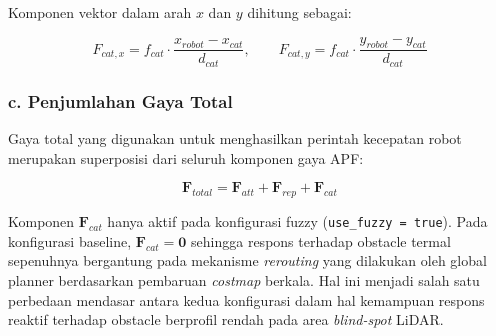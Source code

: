 Komponen vektor dalam arah $x$ dan $y$ dihitung sebagai:

\begin{equation}
    F_{cat,x} = f_{cat} \cdot \frac{x_{robot} - x_{cat}}{d_{cat}},
    \qquad
    F_{cat,y} = f_{cat} \cdot \frac{y_{robot} - y_{cat}}{d_{cat}}
    \label{eq:fcatvec}
\end{equation}

 
\subsubsection*{c. Penjumlahan Gaya Total}
 
Gaya total yang digunakan untuk menghasilkan perintah kecepatan robot
merupakan superposisi dari seluruh komponen gaya APF:
 
\begin{equation}
    \mathbf{F}_{total} = \mathbf{F}_{att} + \mathbf{F}_{rep}
                       + \mathbf{F}_{cat}
    \label{eq:ftotal}
\end{equation}
 
Komponen $\mathbf{F}_{cat}$ hanya aktif pada konfigurasi fuzzy
(\texttt{use\_fuzzy = true}). Pada konfigurasi baseline,
$\mathbf{F}_{cat} = \mathbf{0}$ sehingga respons terhadap obstacle
termal sepenuhnya bergantung pada mekanisme \textit{rerouting} yang
dilakukan oleh global planner berdasarkan pembaruan \textit{costmap}
berkala. Hal ini menjadi salah satu perbedaan mendasar antara kedua
konfigurasi dalam hal kemampuan respons reaktif terhadap obstacle
berprofil rendah pada area \textit{blind-spot} LiDAR.